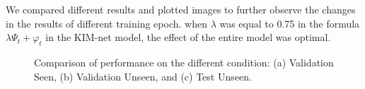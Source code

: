 We compared different results and plotted images to further observe the changes in the results of different training epoch. when ${{\lambda}}$ was equal to 0.75 in the formula ${{\lambda}{\Psi}_{t} + {\varphi}_{t}}$ in the KIM-net model, the effect of the entire model was optimal.

\begin{figure}[htbp]
	\centering
	\centering
	\caption{ Comparison of performance on the different condition: (a) Validation Seen, (b) Validation Unseen, and (c) Test Unseen.}
\end{figure}

